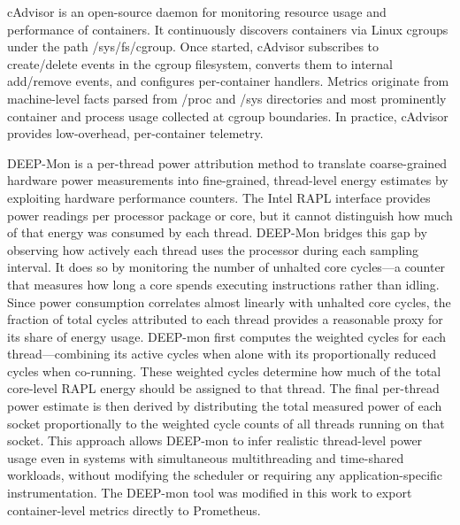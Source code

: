 \begin{table}[htbp]
{\begin{tabular}
            \bottomrule
        \end{tabular}%
    }
    \small
    \caption{Preliminary simulation results for a subset of workflows showing the overall improvement for both runtime and energy consumption compared to the average of 2 naive baselines without co-location.}
\end{table}

cAdvisor is an open-source daemon for monitoring resource usage and performance of containers. It continuously discovers containers via Linux cgroups under the path /sys/fs/cgroup. Once started, cAdvisor subscribes to create/delete events in the cgroup filesystem, converts them to internal add/remove events, and configures per-container handlers. Metrics originate from machine-level facts parsed from /proc and /sys directories and most prominently container and process usage collected at cgroup boundaries. In practice, cAdvisor provides low-overhead, per-container telemetry.%

DEEP-Mon is a per-thread power attribution method to translate coarse-grained hardware power measurements into fine-grained, thread-level energy estimates by exploiting hardware performance counters. The Intel RAPL interface provides power readings per processor package or core, but it cannot distinguish how much of that energy was consumed by each thread. DEEP-Mon bridges this gap by observing how actively each thread uses the processor during each sampling interval. It does so by monitoring the number of unhalted core cycles—a counter that measures how long a core spends executing instructions rather than idling. Since power consumption correlates almost linearly with unhalted core cycles, the fraction of total cycles attributed to each thread provides a reasonable proxy for its share of energy usage. DEEP-mon first computes the weighted cycles for each thread—combining its active cycles when alone with its proportionally reduced cycles when co-running. These weighted cycles determine how much of the total core-level RAPL energy should be assigned to that thread. The final per-thread power estimate is then derived by distributing the total measured power of each socket proportionally to the weighted cycle counts of all threads running on that socket. This approach allows DEEP-mon to infer realistic thread-level power usage even in systems with simultaneous multithreading and time-shared workloads, without modifying the scheduler or requiring any application-specific instrumentation. The DEEP-mon tool was modified in this work to export container-level metrics directly to Prometheus.

